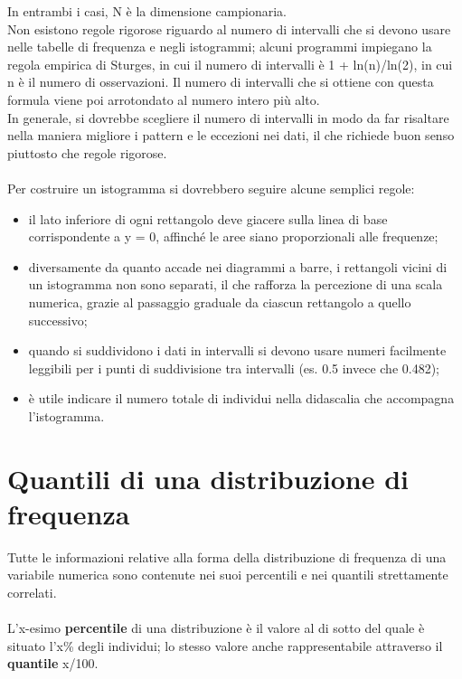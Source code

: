 \documentclass[10pt, draft]{book}
\newcommand{\tightlist}{%
\setlength{\itemsep}{1pt}\setlength{\parskip}{0pt}\setlength{\parsep}{0pt}}
\begin{document}
In entrambi i casi, N è la dimensione campionaria.
\\
Non esistono regole rigorose riguardo al numero di intervalli che si devono usare nelle tabelle di frequenza e negli istogrammi; alcuni programmi impiegano la regola empirica di Sturges, in cui il numero di intervalli è 1 + ln(n)/ln(2), in cui n è il numero di osservazioni. Il numero di intervalli che si ottiene con questa formula viene poi arrotondato al numero intero più alto. 
\\
In generale, si dovrebbe scegliere il numero di intervalli in modo da far risaltare nella maniera migliore i pattern e le eccezioni nei dati, il che richiede buon senso piuttosto che regole rigorose.
\\
\\
Per costruire un istogramma si dovrebbero seguire alcune semplici regole:
\begin{itemize} \tightlist
    \item il lato inferiore di ogni rettangolo deve giacere sulla linea di base corrispondente a y = 0, affinché le aree siano proporzionali alle frequenze;
    \item diversamente da quanto accade nei diagrammi a barre, i rettangoli vicini di un istogramma non sono separati, il che rafforza la percezione di una scala numerica, grazie al passaggio graduale da ciascun rettangolo a quello successivo;
    \item quando si suddividono i dati in intervalli si devono usare numeri facilmente leggibili per i punti di suddivisione tra intervalli (es. 0.5 invece che 0.482);
    \item è utile indicare il numero totale di individui nella didascalia che accompagna l'istogramma.
\end{itemize}

\section{Quantili di una distribuzione di frequenza}
Tutte le informazioni relative alla forma della distribuzione di frequenza di una variabile numerica sono contenute nei suoi percentili e nei quantili strettamente correlati. 
\\
\\
L'x-esimo \textbf{percentile} di una distribuzione è il valore al di sotto del quale è situato l'x\% degli individui; lo stesso valore anche rappresentabile attraverso il \textbf{quantile} x/100.
\end{document}
